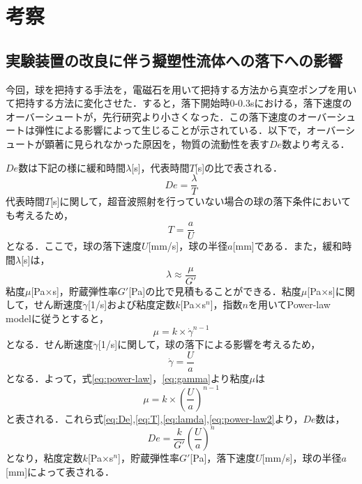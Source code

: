 \section{考察}

\subsection{実験装置の改良に伴う擬塑性流体への落下への影響}

今回，球を把持する手法を，電磁石を用いて把持する方法から真空ポンプを用いて把持する方法に変化させた．すると，落下開始時0-0.3sにおける，落下速度のオーバーシュートが，先行研究より小さくなった．この落下速度のオーバーシュートは弾性による影響によって生じることが示されている\cite{ref:12}．以下で，オーバーシュートが顕著に見られなかった原因を，物質の流動性を表す$De$数より考える．

$De$数は下記の様に緩和時間$\lambda$[s]，代表時間$T$[s]の比で表される．
\begin{equation}
    De = \frac{\lambda}{T}
    \label{eq:De}
\end{equation}
代表時間$T$[s]に関して，超音波照射を行っていない場合の球の落下条件においても考えるため，
\begin{equation}
    T = \frac{a}{U}
    \label{eq:T}
\end{equation}
となる．ここで，球の落下速度$U$[mm/s]，球の半径$a$[mm]である．また，緩和時間$\lambda$[s]は，
\begin{equation}
    \lambda \approx \frac{\mu}{G'}
    \label{eq:lamda}
\end{equation}
粘度$\mu$[Pa$\times$s]，貯蔵弾性率$G'$[Pa]の比で見積もることができる．粘度$\mu$[Pa$\times$s]に関して，せん断速度$\dot{\gamma}$[1/s]および粘度定数$k$[Pa$\times$s${}^n$]，指数$n$を用いてPower-law modelに従うとすると，
\begin{equation}
    \mu = k \times \dot{\gamma}^{n-1}
    \label{eq:power-law}
\end{equation}
となる．せん断速度$\dot{\gamma}$[1/s]に関して，球の落下による影響を考えるため，
\begin{equation}
    \dot{\gamma}=\frac{U}{a}
    \label{eq:gamma}
\end{equation}
となる．よって，式\ref{eq:power-law}，\ref{eq:gamma}より粘度$\mu$は
\begin{equation}
    \mu = k \times \left(\frac{U}{a}\right)^{n-1}
    \label{eq:power-law2}
\end{equation}
と表される．これら式\ref{eq:De},\ref{eq:T},\ref{eq:lamda},\ref{eq:power-law2}より，$De$数は，
\begin{equation}
    De = \frac{k}{G'} {\left(\frac{U}{a}\right)}^n
    \label{eq:De2}
\end{equation}
となり，粘度定数$k$[Pa$\times$s${}^n$]，貯蔵弾性率$G'$[Pa]，落下速度$U$[mm/s]，球の半径$a$[mm]によって表される．

